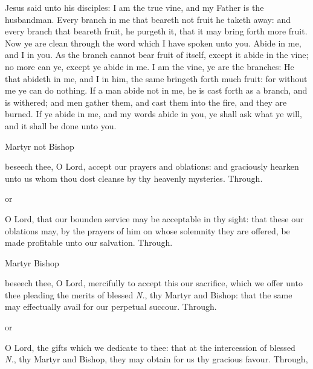 
\label{CommonMartyrEasterGospel}
 Jesus said unto his disciples: I am the true vine, and my Father is the husbandman. Every branch in me that beareth not fruit he taketh away: and every branch that beareth fruit, he purgeth it, that it may bring forth more fruit. Now ye are clean through the word which I have spoken unto you. Abide in me, and I in you. As the branch cannot bear fruit of itself, except it abide in the vine; no more can ye, except ye abide in me. I am the vine, ye are the branches: He that abideth in me, and I in him, the same bringeth forth much fruit: for without me ye can do nothing. If a man abide not in me, he is cast forth as a branch, and is withered; and men gather them, and cast them into the fire, and they are burned. If ye abide in me, and my words abide in you, ye shall ask what ye will, and it shall be done unto you.


\secret
\begin{inhead}
	Martyr not Bishop
\end{inhead}
 beseech thee, O Lord, accept our prayers and oblations: and graciously hearken unto us whom thou dost cleanse by thy heavenly mysteries. Through.
\begin{inhead}
	or
\end{inhead}
 O Lord, that our bounden service may be acceptable in thy sight: that these our oblations may, by the prayers of him on whose solemnity they are offered, be made profitable unto our salvation. Through.

\begin{inhead}
	Martyr Bishop
\end{inhead}
 beseech thee, O Lord, mercifully to accept this our sacrifice, which we offer unto thee pleading the merits of blessed \textit{N.}, thy Martyr and Bishop: that the same may effectually avail for our perpetual succour. Through.

\begin{inhead}
	or
\end{inhead}
 O Lord, the gifts which we dedicate to thee: that at the intercession of blessed \textit{N.}, thy Martyr and Bishop, they may obtain for us thy gracious favour. Through,

